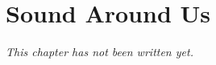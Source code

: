 \chapter{Sound Around Us}\label{ch:g3:sound-around-us}


\emph{This chapter has not been written yet.}
